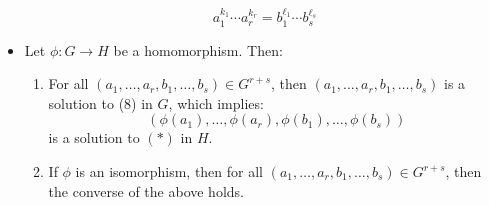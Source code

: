 \begin{itemize}
          \begin{equation}
              a_1^{k_1}\cdots a_r^{k_r} = b_1^{\ell_1}\cdots b_s^{\ell_s}
          \end{equation}
          \item Let $\phi:G\rightarrow H$ be a homomorphism. Then:
          \begin{enumerate}
              \item For all $(a_1,\dots,a_r,b_1,\dots,b_s) \in G^{r+s}$, then $(a_1,\dots, a_r,b_1,\dots,b_s)$ is a solution to (8) in $G$, which implies:
              \begin{equation}
                  (\phi(a_1),\dots,\phi(a_r),\phi(b_1),\dots,\phi(b_s))
              \end{equation}
              is a solution to $(*)$ in $H$.
              \item If $\phi$ is an isomorphism, then for all $(a_1,\dots,a_r,b_1,\dots,b_s)\in G^{r+s}$, then the converse of the above holds.
          \end{enumerate}
\end{itemize}